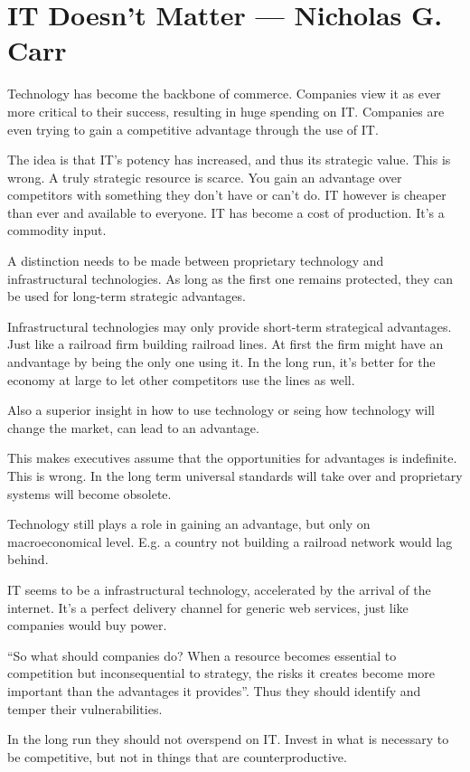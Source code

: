 \section{IT Doesn't Matter --- Nicholas G. Carr}
Technology has become the backbone of commerce. Companies view it as ever more critical to their success, resulting in huge spending on IT. Companies are even trying to gain a competitive advantage through the use of IT.

The idea is that IT's potency has increased, and thus its strategic value. This is wrong. A truly strategic resource is scarce. You gain an advantage over competitors with something they don't have or can't do. IT however is cheaper than ever and available to everyone. IT has become a cost of production. It's a commodity input.

A distinction needs to be made between proprietary technology and infrastructural technologies. As long as the first one remains protected, they can be used for long-term strategic advantages.

Infrastructural technologies may only provide short-term strategical advantages. Just like a railroad firm building railroad lines. At first the firm might have an andvantage by being the only one using it. In the long run, it's better for the economy at large to let other competitors use the lines as well.

Also a superior insight in how to use technology or seing how technology will change the market, can lead to an advantage.

This makes executives assume that the opportunities for advantages is indefinite. This is wrong. In the long term universal standards will take over and proprietary systems will become obsolete.

Technology still plays a role in gaining an advantage, but only on macroeconomical level. E.g. a country not building a railroad network would lag behind.

IT seems to be a infrastructural technology, accelerated by the arrival of the internet. It's a perfect delivery channel for generic web services, just like companies would buy power.

``So what should companies do? When a resource becomes essential to competition but inconsequential to strategy, the risks it creates become more important than the advantages it provides''. Thus they should identify and temper their vulnerabilities.

In the long run they should not overspend on IT. Invest in what is necessary to be competitive, but not in things that are counterproductive.

